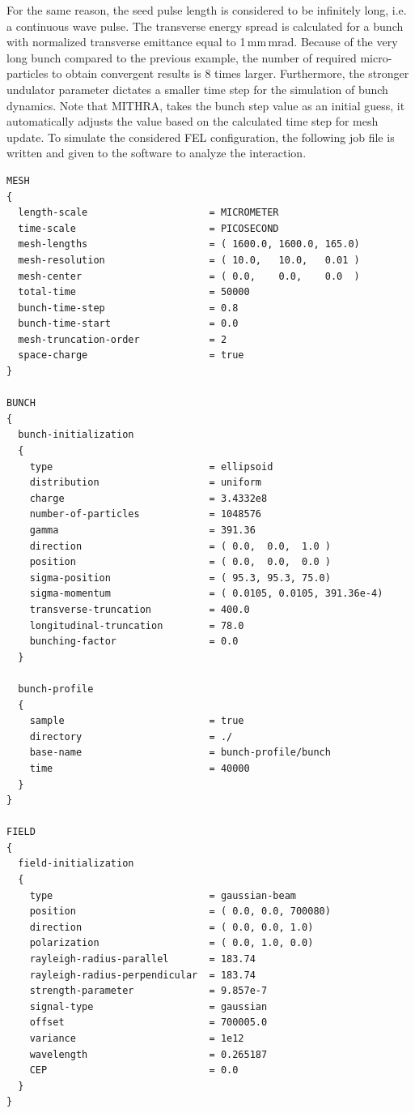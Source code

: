 %
For the same reason, the seed pulse length is considered to be infinitely long, i.e. a continuous wave pulse.
%
The transverse energy spread is calculated for a bunch with normalized transverse emittance equal to 1\,mm\,mrad.
%
Because of the very long bunch compared to the previous example, the number of required micro-particles to obtain convergent results is 8 times larger.
%
Furthermore, the stronger undulator parameter dictates a smaller time step for the simulation of bunch dynamics.
%
Note that MITHRA, takes the bunch step value as an initial guess, it automatically adjusts the value based on the calculated time step for mesh update.
%
To simulate the considered FEL configuration, the following job file is written and given to the software to analyze the interaction.
%
\begin{snugshade}
\begin{Verbatim}[fontsize=\small, tabsize = 4]
MESH
{
  length-scale                     = MICROMETER
  time-scale                       = PICOSECOND
  mesh-lengths                     = ( 1600.0, 1600.0, 165.0)
  mesh-resolution                  = ( 10.0,   10.0,   0.01 )
  mesh-center                      = ( 0.0,    0.0,    0.0  )
  total-time                       = 50000
  bunch-time-step                  = 0.8
  bunch-time-start                 = 0.0
  mesh-truncation-order            = 2
  space-charge                     = true
}

BUNCH
{
  bunch-initialization
  {
    type                           = ellipsoid
    distribution                   = uniform
    charge                         = 3.4332e8
    number-of-particles            = 1048576
    gamma                          = 391.36
    direction                      = ( 0.0,  0.0,  1.0 )
    position                       = ( 0.0,  0.0,  0.0 )
    sigma-position                 = ( 95.3, 95.3, 75.0)
    sigma-momentum                 = ( 0.0105, 0.0105, 391.36e-4)
    transverse-truncation          = 400.0
    longitudinal-truncation        = 78.0
    bunching-factor                = 0.0
  }

  bunch-profile
  {
    sample                         = true
    directory                      = ./
    base-name                      = bunch-profile/bunch
    time                           = 40000
  }
}

FIELD
{
  field-initialization
  {
    type                           = gaussian-beam
    position                       = ( 0.0, 0.0, 700080)
    direction                      = ( 0.0, 0.0, 1.0)
    polarization                   = ( 0.0, 1.0, 0.0)
    rayleigh-radius-parallel       = 183.74
    rayleigh-radius-perpendicular  = 183.74
    strength-parameter             = 9.857e-7
    signal-type                    = gaussian
    offset                         = 700005.0
    variance                       = 1e12
    wavelength                     = 0.265187
    CEP                            = 0.0
  }
}


\end{Verbatim}
\end{snugshade}
